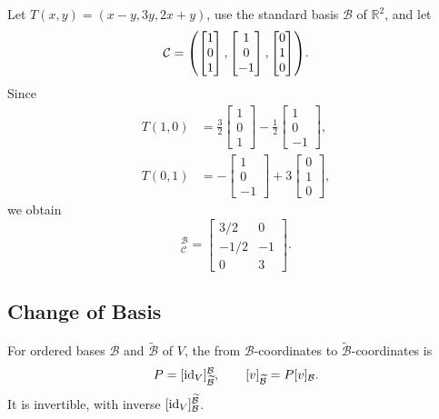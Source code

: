 \begin{Example}
Let $T(x,y)=(x-y,3y,2x+y)$, use the standard basis $\mathcal B$ of $\mathbb R^2$, and let
\begin{equation*}
\mathcal C=\pqty{\begin{bmatrix}1\\0\\1\end{bmatrix},\begin{bmatrix}1\\0\\-1\end{bmatrix},\begin{bmatrix}0\\1\\0\end{bmatrix}}.
\end{equation*}
Since
\begin{align*}
T(1,0)&=\tfrac32\begin{bmatrix}1\\0\\1\end{bmatrix}-\tfrac12\begin{bmatrix}1\\0\\-1\end{bmatrix},\\
T(0,1)&=-\begin{bmatrix}1\\0\\-1\end{bmatrix}+3\begin{bmatrix}0\\1\\0\end{bmatrix},
\end{align*}
we obtain
\begin{equation*}
[T]_{\mathcal C}^{\mathcal B}=\begin{bmatrix}3/2&0\\-1/2&-1\\0&3\end{bmatrix}.
\end{equation*}
\end{Example}

\subsection{Change of Basis}

\begin{Definition}
For ordered bases $\mathcal B$ and $\widetilde{\mathcal B}$ of $V$, the  from $\mathcal B$-coordinates to $\widetilde{\mathcal B}$-coordinates is
\begin{equation*}
P=[\mathrm{id}_V]_{\widetilde{\mathcal B}}^{\mathcal B},\qquad [v]_{\widetilde{\mathcal B}}=P[v]_{\mathcal B}.
\end{equation*}
It is invertible, with inverse $[\mathrm{id}_V]_{\mathcal B}^{\widetilde{\mathcal B}}$.
\end{Definition}

